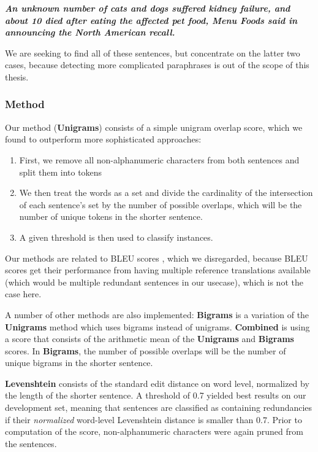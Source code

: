 \documentclass[a4paper,10pt]{scrartcl}
\theoremstyle{style}
\begin{document}
\textit{\textbf{An unknown number of cats and dogs suffered kidney failure, and about 10 died after eating the affected pet food, Menu Foods said in announcing the North American recall.}}

We are seeking to find all of these sentences, but concentrate on the latter two cases, because detecting more complicated paraphrases is out of the scope of this thesis.%

\subsubsection{Method}
\label{s_unigrams}

Our method (\textbf{Unigrams}) consists of a simple unigram overlap score, which we found to outperform more sophisticated approaches:

\begin{enumerate}
\item First, we remove all non-alphanumeric characters from both sentences and split them into tokens
\item We then treat the words as a set and divide the cardinality of the intersection of each sentence's set by the number of possible overlaps, which will be the number of unique tokens in the shorter sentence.
\item A given threshold is then used to classify instances.
\end{enumerate}

Our methods are related to BLEU scores \citep{papineni2002bleu}, which we disregarded, because BLEU scores get their performance from having multiple reference translations available (which would be multiple redundant sentences in our usecase), which is not the case here.

A number of other methods are also implemented: \textbf{Bigrams} is a variation of the \textbf{Unigrams} method which uses bigrams instead of unigrams. \textbf{Combined} is using a score that consists of the arithmetic mean of the \textbf{Unigrams} and \textbf{Bigrams} scores. In \textbf{Bigrams}, the number of possible overlaps will be the number of unique bigrams in the shorter sentence.

\textbf{Levenshtein} consists of the standard edit distance \citep{levenshtein1966binary} on word level, normalized by the length of the shorter sentence. A threshold of 0.7 yielded best results on our development set, meaning that sentences are classified as containing redundancies if their \textit{normalized} word-level Levenshtein distance is smaller than 0.7. Prior to computation of the score, non-alphanumeric characters were again pruned from the sentences.
\end{document}
